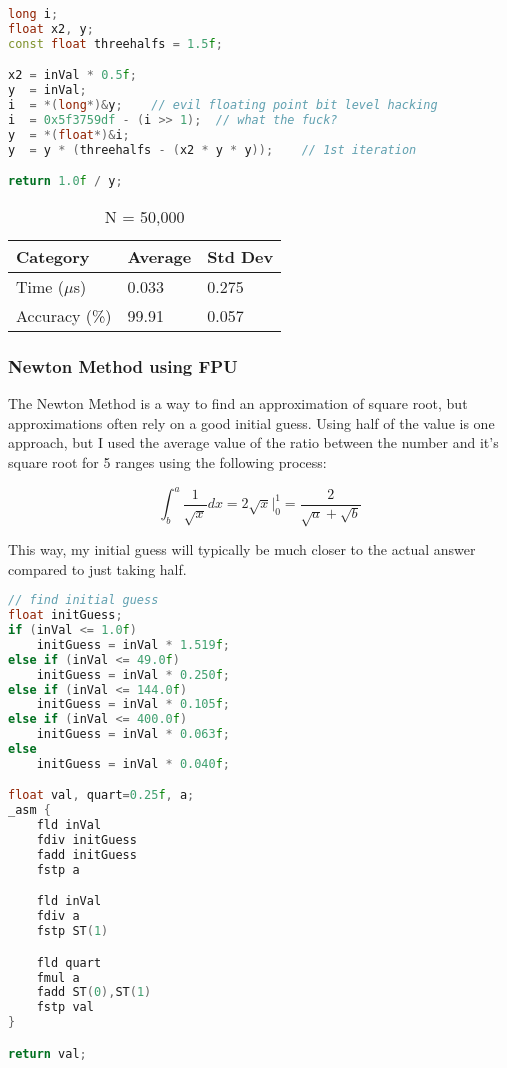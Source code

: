 \documentclass{article}
\begin{document}
\begin{lstlisting}[language=C++]
long i;
float x2, y;
const float threehalfs = 1.5f;

x2 = inVal * 0.5f;
y  = inVal;
i  = *(long*)&y;   	// evil floating point bit level hacking
i  = 0x5f3759df - (i >> 1);  // what the fuck? 
y  = *(float*)&i;
y  = y * (threehalfs - (x2 * y * y));	 // 1st iteration

return 1.0f / y;
\end{lstlisting}

\vspace{3mm}

\begin{table}[ht!]
\centering
\begin{tabular}{l|l|l}
Category        &   Average &   Std Dev \\
\hline
Time ($\mu$s)    &   0.033   &   0.275   \\
Accuracy (\%)   &   99.91   &   0.057   \\
\end{tabular}
\caption{N = 50,000}
\end{table}

\vspace{5mm}

\subsubsection{Newton Method using FPU}

The Newton Method is a way to find an approximation of square root, but approximations often rely on a good initial guess. Using half of the value is one approach, but I used the average value of the ratio between the number and it's square root for 5 ranges using the following process:

\[\int_{b}^{a}\frac{1}{\sqrt{x}}dx=2\sqrt{x}|_0^1=\frac{2}{\sqrt{a}+\sqrt{b}}\]

This way, my initial guess will typically be much closer to the actual answer compared to just taking half.

\begin{lstlisting}[language=C++]
// find initial guess
float initGuess;
if (inVal <= 1.0f)
	initGuess = inVal * 1.519f;
else if (inVal <= 49.0f)
	initGuess = inVal * 0.250f;
else if (inVal <= 144.0f)
	initGuess = inVal * 0.105f;
else if (inVal <= 400.0f)
	initGuess = inVal * 0.063f;
else
	initGuess = inVal * 0.040f;

float val, quart=0.25f, a;
_asm {
	fld inVal
	fdiv initGuess
	fadd initGuess
	fstp a

	fld inVal
	fdiv a
	fstp ST(1)

	fld quart
	fmul a
	fadd ST(0),ST(1)
	fstp val
}

return val;
\end{lstlisting}
\end{document}
